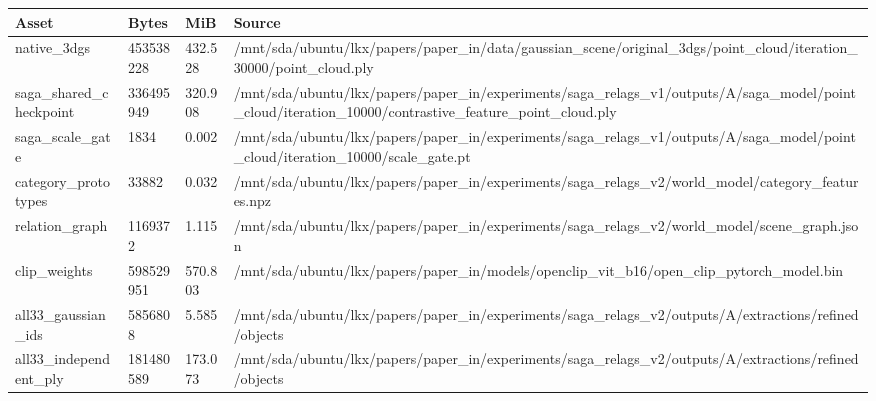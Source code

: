 \begin{tabular}{llll}
\hline
Asset & Bytes & MiB & Source \\
\hline
native\_3dgs & 453538228 & 432.528 & /mnt/sda/ubuntu/lkx/papers/paper\_in/data/gaussian\_scene/original\_3dgs/point\_cloud/iteration\_30000/point\_cloud.ply \\
saga\_shared\_checkpoint & 336495949 & 320.908 & /mnt/sda/ubuntu/lkx/papers/paper\_in/experiments/saga\_relags\_v1/outputs/A/saga\_model/point\_cloud/iteration\_10000/contrastive\_feature\_point\_cloud.ply \\
saga\_scale\_gate & 1834 & 0.002 & /mnt/sda/ubuntu/lkx/papers/paper\_in/experiments/saga\_relags\_v1/outputs/A/saga\_model/point\_cloud/iteration\_10000/scale\_gate.pt \\
category\_prototypes & 33882 & 0.032 & /mnt/sda/ubuntu/lkx/papers/paper\_in/experiments/saga\_relags\_v2/world\_model/category\_features.npz \\
relation\_graph & 1169372 & 1.115 & /mnt/sda/ubuntu/lkx/papers/paper\_in/experiments/saga\_relags\_v2/world\_model/scene\_graph.json \\
clip\_weights & 598529951 & 570.803 & /mnt/sda/ubuntu/lkx/papers/paper\_in/models/openclip\_vit\_b16/open\_clip\_pytorch\_model.bin \\
all33\_gaussian\_ids & 5856808 & 5.585 & /mnt/sda/ubuntu/lkx/papers/paper\_in/experiments/saga\_relags\_v2/outputs/A/extractions/refined/objects \\
all33\_independent\_ply & 181480589 & 173.073 & /mnt/sda/ubuntu/lkx/papers/paper\_in/experiments/saga\_relags\_v2/outputs/A/extractions/refined/objects \\
\hline
\end{tabular}

